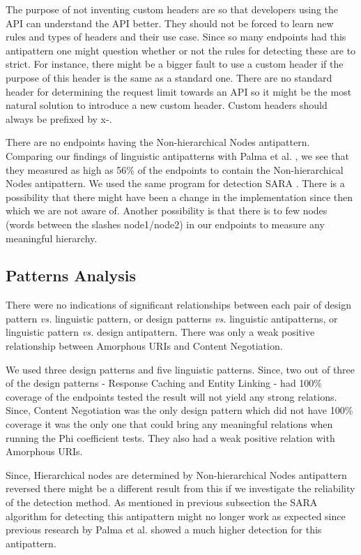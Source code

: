 \documentclass[a4paper,12pt]{article}
\begin{document}
The purpose of not inventing custom headers are so that developers using the API can understand the API better. They should not be forced to learn new rules and types of headers and their use case. Since so many endpoints had this antipattern one might question whether or not the rules for detecting these are to strict. For instance, there might be a bigger fault to use a custom header if the purpose of this header is the same as a standard one. There are no standard header for determining the request limit towards an API so it might be the most natural solution to introduce a new custom header. Custom headers should always be prefixed by x-. 

There are no endpoints having the Non-hierarchical Nodes antipattern. Comparing our findings of linguistic antipatterns with Palma et al. \cite{linguistic}, we see that they measured as high as 56\% of the endpoints to contain the Non-hierarchical Nodes antipattern. We used the same program for detection SARA \cite{linguistic}. There is a possibility that there might have been a change in the implementation since then which we are not aware of. Another possibility is that there is to few nodes (words between the slashes node1/node2) in our endpoints to measure any meaningful hierarchy.

\subsection{Patterns Analysis}

There were no indications of significant relationships between each pair of design pattern \textit{vs.} linguistic pattern, or design patterns \textit{vs.} linguistic antipatterns, or linguistic pattern \textit{vs.} design antipattern. There was only a weak positive relationship between Amorphous URIs and Content Negotiation. 

We used three design patterns and five linguistic patterns. Since, two out of three of the design patterns - Response Caching and Entity Linking - had 100\% coverage of the endpoints tested the result will not yield any strong relations. Since, Content Negotiation was the only design pattern which did not have 100\% coverage it was the only one that could bring any meaningful relations when running the Phi coefficient tests. They also had a weak positive relation with Amorphous URIs.

Since, Hierarchical nodes are determined by Non-hierarchical Nodes antipattern reversed there might be a different result from this if we investigate the reliability of the detection method. As mentioned in previous subsection the SARA algorithm for detecting this antipattern might no longer work as expected since previous research by Palma et al.  \cite{linguistic} showed a much higher detection for this antipattern.
\end{document}
